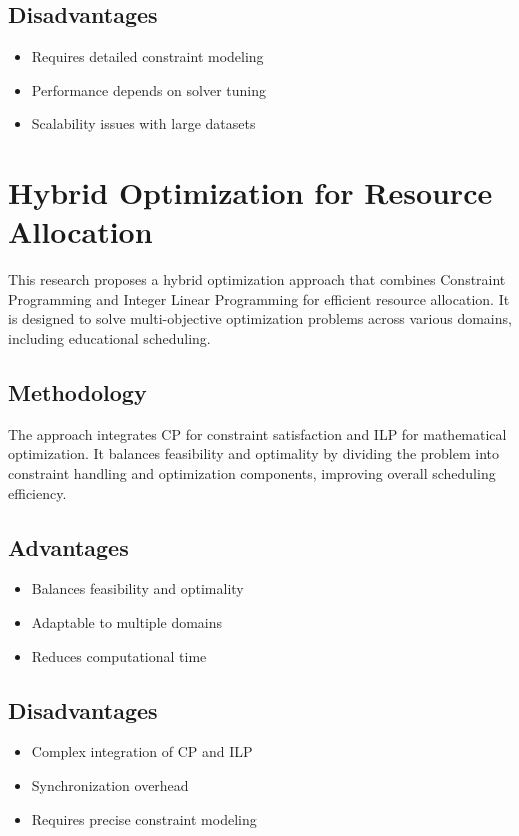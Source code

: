\documentclass[a4paper, 12pt]{report}
\begin{document}
\subsection{Disadvantages}
\begin{itemize}
    \item Requires detailed constraint modeling
    \item Performance depends on solver tuning
    \item Scalability issues with large datasets
\end{itemize}


\section{Hybrid Optimization for Resource Allocation}
\par This research proposes a hybrid optimization approach that combines Constraint Programming and Integer Linear Programming for efficient resource allocation. It is designed to solve multi-objective optimization problems across various domains, including educational scheduling.

\subsection{Methodology}
\par The approach integrates CP for constraint satisfaction and ILP for mathematical optimization. It balances feasibility and optimality by dividing the problem into constraint handling and optimization components, improving overall scheduling efficiency.

\subsection{Advantages}
\begin{itemize}
    \item Balances feasibility and optimality
    \item Adaptable to multiple domains
    \item Reduces computational time
\end{itemize}

\subsection{Disadvantages}
\begin{itemize}
    \item Complex integration of CP and ILP
    \item Synchronization overhead
    \item Requires precise constraint modeling
\end{itemize}
\end{document}
